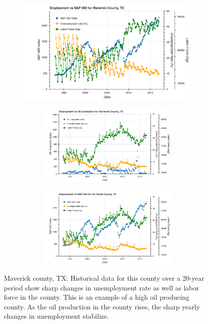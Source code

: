 \documentclass[11pt,letterpaper]{article}
\begin{document}
\begin{figure}
\begin{subfigure}{0.6\textwidth}
\includegraphics[width=\linewidth]{tx_maverick_snp}


\begin{subfigure}{0.6\textwidth}
\includegraphics[width=\linewidth]{tx_valverde_oil_prod}
\end{subfigure}

\begin{subfigure}{0.6\textwidth}
\includegraphics[width=\linewidth]{tx_valverde_snp}
\end{subfigure}
\end{subfigure}
\caption{Maverick county, TX: Historical data for this county over a 20-year period show sharp changes in unemployment rate as well as labor force in the county. This is an example of a high oil producing county. As the oil production in the county rises, the sharp yearly changes in unemployment stabilize.}
\label{fig:tx_maverick}
\end{figure}
\end{document}
